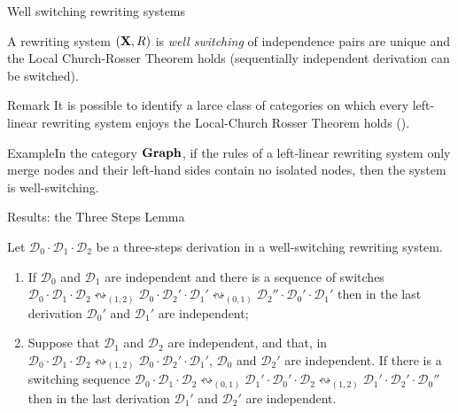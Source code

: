 \documentclass[usenames,dvipsnames]{beamer}
\newcommand{\shift}[1]{\ensuremath{\mathrel{{\leftrightsquigarrow}_{#1}}}}
\newcommand{\dder}[1]{\mathscr{#1}}
\newcommand{\catname}[1]{{\normalfont\textbf{#1}}}
\def\X{\textbf {\textup{X}}}
\begin{document}
\begin{frame}{Well switching rewriting systems}\justifying


\begin{definition}
A rewriting system $(\X, R)$ is \emph{well switching} of independence pairs are unique and the Local Church-Rosser Theorem holds (sequentially independent derivation can be switched).
\end{definition}
\pause 
\begin{block}{Remark}
	It is possible to identify a larce class of categories on which every left-linear rewriting system enjoys the Local-Church Rosser Theorem holds (\cite{baldan2011adhesivity}).
\end{block}
\pause 
\begin{block}{Example}In the category $\catname{Graph}$, if the rules of a left-linear rewriting system only merge nodes and their left-hand sides contain no isolated nodes, then the system is well-switching.
\end{block}

\end{frame}

\begin{frame}{Results: the Three Steps Lemma}\justifying

\begin{lemma}  Let
	$\dder{D}_0\cdot \dder{D}_1 \cdot \dder{D}_2$ be a three-steps
	derivation in a well-switching rewriting system. 
	\begin{enumerate}\justifying
		\item
		If $\dder{D}_0$ and $\dder{D}_1$ are independent and there is a
		 sequence of switches
		$\dder{D}_0\cdot \dder{D}_1 \cdot \dder{D}_2 \shift{(1,2)}
		\dder{D}_0 \cdot \dder{D}_2' \cdot \dder{D}_1' \shift{(0,1)}
		\dder{D}_2'' \cdot \dder{D}_0' \cdot \dder{D}_1'$ then
		in the last derivation $\dder{D}_0'$ and $\dder{D}_1'$ are independent;
		
		\item
		\label{lem:indep-global-left:2}
		Suppose that $\dder{D}_1$ and $\dder{D}_2$ are independent, and that, in $\dder{D}_0\cdot \dder{D}_1 \cdot \dder{D}_2 \shift{(1,2)}
		\dder{D}_0 \cdot \dder{D}_2' \cdot \dder{D}_1'$, $\dder{D}_0$ and $\dder{D}_2'$ are independent.  If there
		is a switching sequence
		$\dder{D}_0\cdot \dder{D}_1 \cdot \dder{D}_2 \shift{(0,1)}
		\dder{D}_1' \cdot \dder{D}_0' \cdot \dder{D}_2 \shift{(1,2)}
		\dder{D}_1' \cdot \dder{D}_2' \cdot \dder{D}_0''$ then in the last derivation $\dder{D}_1'$ and $\dder{D}_2'$ are independent.
	\end{enumerate}
\end{lemma}
\end{frame}
\end{document}
